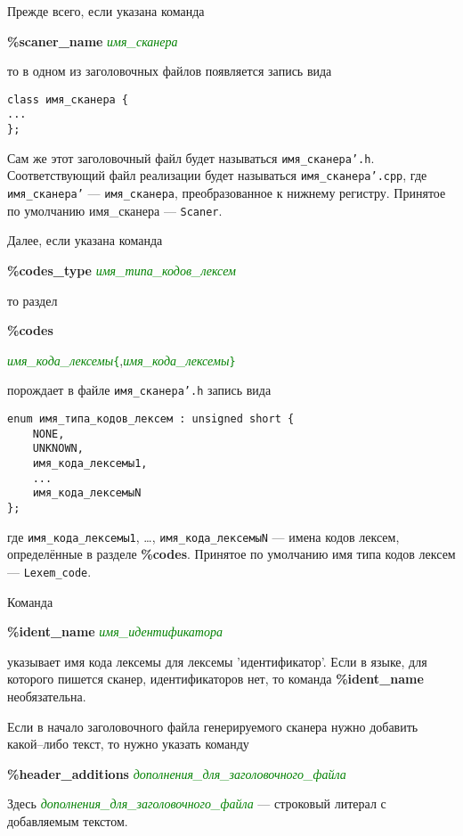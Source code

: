 \documentclass[10pt]{report}
\begin{document}
Прежде всего, если указана команда

{\noindent%
\textbf{\%scaner_name} \textcolor{Green}{\textit{имя_сканера}}
}

\noindent%
то в одном из заголовочных файлов появляется запись вида
\begin{verbatim}
class имя_сканера {
...
};
\end{verbatim}
Сам же этот заголовочный файл будет называться \texttt{имя_сканера'.h}. Соответствующий файл реализации будет называться \texttt{имя_сканера'.cpp}, где \texttt{имя_сканера'} --- \texttt{имя_сканера}, преобразованное к нижнему регистру. Принятое по умолчанию имя_сканера --- \texttt{Scaner}.

Далее, если указана команда

{\noindent%
\textbf{\%codes_type} \textcolor{Green}{\textit{имя_типа_кодов_лексем}}
}

\noindent то раздел

{\noindent%
\textbf{\%codes}

\textcolor{Green}{\textit{имя_кода_лексемы}}\texttt{\textcolor{Green}{\{}},\textcolor{Green}{\textit{имя_кода_лексемы}}\texttt{\textcolor{Green}{\}}}
}

\noindent%
порождает в файле \texttt{имя_сканера'.h} запись вида 
\begin{verbatim}
enum имя_типа_кодов_лексем : unsigned short {
    NONE,
    UNKNOWN,
    имя_кода_лексемы1,
    ...
    имя_кода_лексемыN
};
\end{verbatim}
где \texttt{имя_кода_лексемы1}, \dots, \texttt{имя_кода_лексемыN} ---  имена кодов лексем, определённые в разделе \textbf{\%codes}.  Принятое по умолчанию имя типа кодов лексем --- \texttt{Lexem_code}.

Команда

\noindent%
\textbf{\%ident_name} \textcolor{Green}{\textit{имя_идентификатора}}

\noindent указывает имя кода лексемы для лексемы 'идентификатор'. Если в языке, для которого пишется сканер, идентификаторов нет, то команда \textbf{\%ident_name} необязательна.

Если в начало заголовочного файла генерируемого сканера нужно добавить какой--либо текст, то нужно указать команду

\noindent%
\textbf{\%header_additions}  \textcolor{Green}{\textit{дополнения_для_заголовочного_файла}}

\noindent%
Здесь  \textcolor{Green}{\textit{дополнения_для_заголовочного_файла}} --- строковый литерал с добавляемым текстом.
\end{document}

